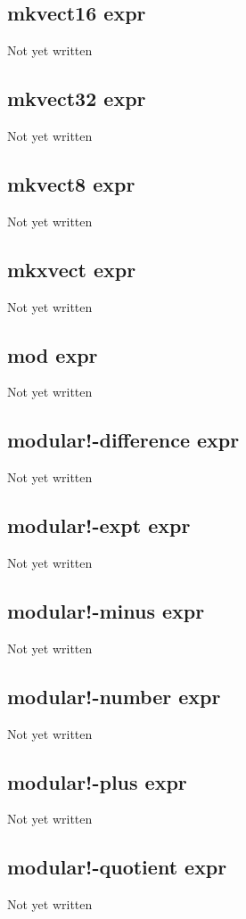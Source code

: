 \documentclass[a4paper,11pt]{article}
\begin{document}
\subsection{\ttfamily mkvect16 expr}
Not yet written

\subsection{\ttfamily mkvect32 expr}
Not yet written

\subsection{\ttfamily mkvect8 expr}
Not yet written

\subsection{\ttfamily mkxvect expr}
Not yet written

\subsection{\ttfamily mod expr}
Not yet written

\subsection{\ttfamily modular!-difference expr}
Not yet written

\subsection{\ttfamily modular!-expt expr}
Not yet written

\subsection{\ttfamily modular!-minus expr}
Not yet written

\subsection{\ttfamily modular!-number expr}
Not yet written

\subsection{\ttfamily modular!-plus expr}
Not yet written

\subsection{\ttfamily modular!-quotient expr}
Not yet written
\end{document}
